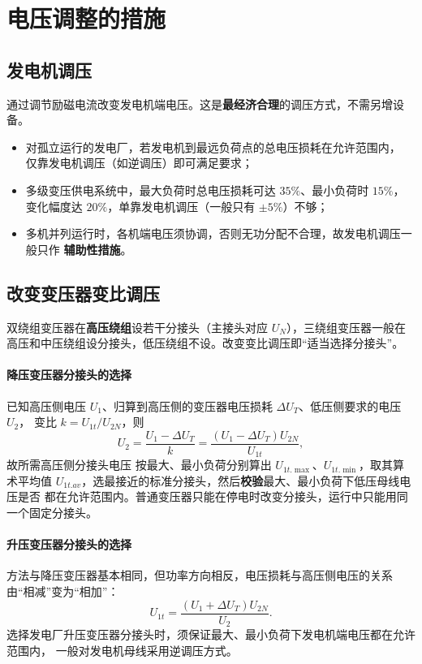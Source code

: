 \section{电压调整的措施}

\subsection{发电机调压}

通过调节励磁电流改变发电机端电压。这是\textbf{最经济合理}的调压方式，不需另增设备。
\begin{itemize}
  \item 对孤立运行的发电厂，若发电机到最远负荷点的总电压损耗在允许范围内，
        仅靠发电机调压（如逆调压）即可满足要求；
  \item 多级变压供电系统中，最大负荷时总电压损耗可达 $35\%$、最小负荷时 $15\%$，
        变化幅度达 $20\%$，单靠发电机调压（一般只有 $\pm5\%$）不够；
  \item 多机并列运行时，各机端电压须协调，否则无功分配不合理，故发电机调压一般只作
        \textbf{辅助性措施}。
\end{itemize}

\subsection{改变变压器变比调压}

双绕组变压器在\textbf{高压绕组}设若干分接头（主接头对应 $U_N$），三绕组变压器一般在
高压和中压绕组设分接头，低压绕组不设。改变变比调压即“适当选择分接头”。

\paragraph{降压变压器分接头的选择}
已知高压侧电压 $U_1$、归算到高压侧的变压器电压损耗 $\Delta U_T$、低压侧要求的电压 $U_2$，
变比 $k=U_{1t}/U_{2N}$，则
\begin{equation}
  U_2=\frac{U_1-\Delta U_T}{k}=\frac{\left(U_1-\Delta U_T\right)U_{2N}}{U_{1t}},
\end{equation}
故所需高压侧分接头电压
按最大、最小负荷分别算出 $U_{1t.\max}$、$U_{1t.\min}$，取其算术平均值
$U_{1t.av}$，选最接近的标准分接头，然后\textbf{校验}最大、最小负荷下低压母线电压是否
都在允许范围内。普通变压器只能在停电时改变分接头，运行中只能用同一个固定分接头。

\paragraph{升压变压器分接头的选择}
方法与降压变压器基本相同，但功率方向相反，电压损耗与高压侧电压的关系由“相减”变为“相加”：
\begin{equation}
  U_{1t}=\frac{\left(U_1+\Delta U_T\right)U_{2N}}{U_2}.
\end{equation}
选择发电厂升压变压器分接头时，须保证最大、最小负荷下发电机端电压都在允许范围内，
一般对发电机母线采用逆调压方式。

